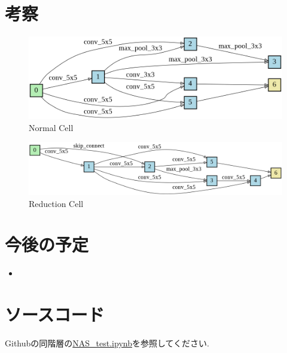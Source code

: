\documentclass[twocolumn]{jarticle}     %
\begin{document}
\section{考察}

\begin{figure}[t]
	\begin{center}
		\includegraphics[clip,width=12.5cm]{completenormal.png}
		\caption{Normal Cell}
		\label{fig:cell}
	\end{center}
\end{figure}

\begin{figure}[t]
	\begin{center}
		\includegraphics[clip,width=14.5cm]{completereduce.png}
		\caption{Reduction Cell}
		\label{fig:cell2}
	\end{center}
\end{figure}

\section{今後の予定}
\begin{itemize}
  \item
\end{itemize}

\section{ソースコード}
Githubの同階層の\url{NAS_test.ipynb}を参照してください.



\end{document}
